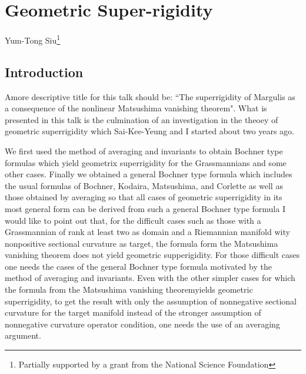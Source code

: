 \chapter{Geometric Super-rigidity}\label{chap16}


\begin{center}
Yum-Tong Siu\footnote{Partially supported by a grant from the National Science Foundation}
\end{center}

\section*{Introduction}

\setcounter{pageoriginal}{298}
A\pageoriginale more descriptive title for this talk should be: ``The superrigidity of Margulis as a consequence of the nonlinear Matsushima vanishing theorem". What is presented in this talk is the culmination of an investigation in the theoey of geometric superrigidity which Sai-Kee-Yeung and I started about two years ago.

We first used the method of averaging and invariants to obtain Boch\-ner type formulas which yield geometrix superrigidity for the Grassmannians and some other cases. Finally we obtained a general Bochner type formula which includes the usual formulas of Bochner, Kodaira, Matsushima, and Corlette as well as those obtained by averaging so that all cases of geometric superrigidity in its most general form can be derived from such a general Bochner type formula I would like to point out that, for the difficult cases such as those with a Grassmannian of rank at least two as domain and a Riemannian manifold wity nonpositive sectional curvature as target, the formula form the Matsushima vanishing theorem does not yield geometric supperigidity. For those difficult cases one needs the cases of the general Bochner type formula motivated by the method of averaging and invariants. Even with the other simpler cases for which the formula from the Matsushima vanishing theorem\pageoriginale yields geometric superrigidity, to get the result with only the assumption of nonnegative sectional curvature for the target manifold instead of the stronger assumption of nonnegative curvature operator condition, one needs the use of an averaging argument.

\newpage

